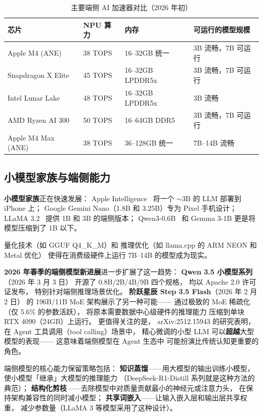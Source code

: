 \begin{table}[H]
\centering\small
\caption{主要端侧 AI 加速器对比（2026 年初）}
\begin{tabularx}{\linewidth}{l l l X}
\toprule
\textbf{芯片} & \textbf{NPU 算力} & \textbf{内存} & \textbf{可运行的模型规模} \\
\midrule
Apple M4 (ANE) & 38 TOPS & 16--32GB 统一 & 3B 流畅，7B 可运行 \\
Snapdragon X Elite & 45 TOPS & 16--32GB LPDDR5x & 3B 流畅，7B 可运行 \\
Intel Lunar Lake & 48 TOPS & 16--32GB LPDDR5x & 3B 流畅 \\
AMD Ryzen AI 300 & 50 TOPS & 16--64GB DDR5 & 3B 流畅，7B 可运行 \\
Apple M4 Max (ANE) & 38 TOPS & 36--128GB 统一 & 7B--14B 流畅 \\
\bottomrule
\end{tabularx}
\end{table}

\subsection{小模型家族与端侧能力}

\textbf{小模型家族}正在快速发展：
Apple Intelligence~\cite{gunter2024appleintelligence}
将一个 $\sim$3B 的 LLM 部署到 iPhone 上；
Google Gemini Nano（1.8B 和 3.25B）专为 Pixel 手机设计；
LLaMA 3.2~\cite{dubey2024llama3} 提供 1B 和 3B 的端侧版本；
Qwen3-0.6B~\cite{qwen2025qwen3} 和 Gemma 3-1B
更是将模型压缩到了 1B 以下。

量化技术（如 GGUF Q4\_K\_M）和
推理优化（如 llama.cpp 的 ARM NEON 和 Metal 优化）
使得在消费级硬件上运行 7B--14B 的模型成为现实。

\textbf{2026 年春季的端侧模型新进展}进一步扩展了这一趋势：
\textbf{Qwen 3.5 小模型系列}（2026 年 3 月 3 日）
开源了 0.8B/2B/4B/9B 四个规格，
均以 Apache 2.0 许可证发布，
特别针对端侧推理场景优化。
\textbf{阶跃星辰 Step 3.5 Flash}（2026 年 2 月 2 日）
的 196B/11B MoE 架构展示了另一种可能——
通过极致的 MoE 稀疏化（仅 5.6\% 的参数活跃），
将原本需要数据中心级硬件的推理能力
压缩到单块 RTX 4090（24GB）上运行。
更值得关注的是，
arXiv:2512.15943 的研究表明，
在 Agent 工具调用（tool calling）场景中，
精心微调的小型 LLM 可以\textbf{超越}大型模型的表现——
这意味着端侧模型在 Agent 生态中
可能扮演比传统认知更重要的角色。

端侧模型的核心能力保留策略包括：
\textbf{知识蒸馏}——用大模型的输出训练小模型，
使小模型「继承」大模型的推理能力
（DeepSeek-R1-Distill 系列就是这种方法的典范）；
\textbf{结构化剪枝}——去除模型中对质量贡献最小的神经元或注意力头，
在保持架构兼容性的同时减小模型；
\textbf{共享词嵌入}——让输入嵌入层和输出层共享权重，
减少参数量（LLaMA 3 等模型采用了这种设计）。

